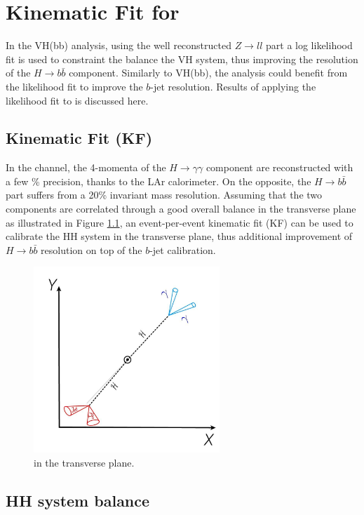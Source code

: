 \chapter{Kinematic Fit for \HHyybb}
\label{Adx4}

In the VH(bb) analysis, using the well reconstructed $Z\to ll$ part a log likelihood fit is used to constraint the balance the VH system, thus improving the resolution of the $H\to b\bar{b}$ component. Similarly to VH(bb), the \HHyybb analysis could benefit from the likelihood fit to improve the $b$-jet resolution. Results of applying the likelihood fit to \HHyybb is discussed here.

\section{Kinematic Fit (KF)}
In the \HHyybb channel, the 4-momenta of the $H\to\gamma\gamma$ component are reconstructed with a few \% precision, thanks to the LAr calorimeter. On the opposite, the $H\to b\bar{b}$ part suffers from a 20\% invariant mass resolution. Assuming that the two components are correlated through a good overall balance in the transverse plane as illustrated in Figure \ref{fig:Adx4:HH}, an event-per-event kinematic fit (KF) can be used to calibrate the HH system in the transverse plane, thus additional improvement of $H\to b\bar{b}$ resolution on top of the $b$-jet calibration.
\begin{figure}[H]
    \centering
    \includegraphics[width=7cm,height=7cm]{Adx/Adx4/Img/HH.png}
    \caption{\HHyybb in the transverse plane.}
    \label{fig:Adx4:HH}
\end{figure}
\section{HH system balance}


